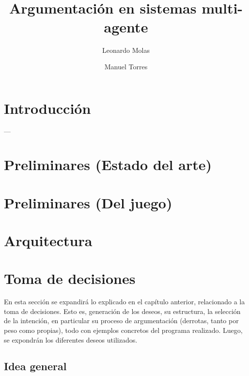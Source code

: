 \documentclass[oneside]{book}
\title{Argumentación en sistemas multi-agente} %
\author{Leonardo Molas \and Manuel Torres}
\begin{document}
\maketitle
\tableofcontents

\chapter*{Introducción}

---


\chapter{Preliminares (Estado del arte)} %


\chapter{Preliminares (Del juego)}


\chapter{Arquitectura}


\chapter{Toma de decisiones}

En esta sección se expandirá lo explicado en el capítulo anterior, relacionado a 
la toma de decisiones. Esto es, generación de los deseos, su estructura, la selección de la
intención, en particular su proceso de argumentación (derrotas, tanto por peso como 
propias), todo con ejemplos concretos del programa realizado. Luego, se expondrán los 
diferentes deseos utilizados.


\section{Idea general}
\end{document}
